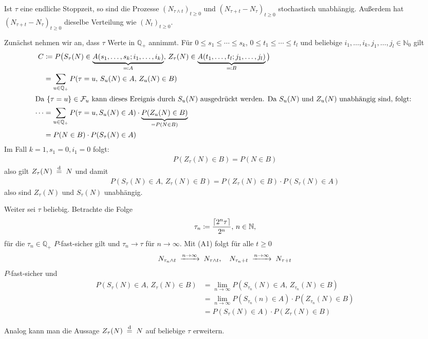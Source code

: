 \documentclass[a4paper,twoside,DIV15,BCOR12mm]{scrbook}
\newcommand{\cF}{\mathcal F}
\begin{document}
\begin{lemma}
\label{lem:7.2}
Ist $\tau$ eine endliche Stoppzeit, so sind die Prozesse $(N_{\tau \wedge t})_{t\ge 0}$ und $(N_{\tau + t}-N_\tau)_{t\ge 0}$ stochastisch unabhängig. Außerdem hat $(N_{\tau + t}-N_\tau)_{t\ge 0}$ dieselbe Verteilung wie $(N_t)_{t\ge 0}$.
\end{lemma}

\begin{beweis}
Zunächst nehmen wir an, dass $\tau$ Werte in $\mathbb Q_+$ annimmt. Für $0\le s_1\le\cdots\le s_k$, $0\le t_1\le \cdots\le t_l$ und beliebige $i_1,\ldots,i_k,j_1,\ldots,j_l\in \mathbb N_0$ gilt
\begin{align*}
C&\da P\big(S_\tau(N) \in \underbrace{A(s_1,\ldots,s_k;i_1,\ldots,i_k)}_{\ad A},\,
Z_\tau(N) \in \underbrace{A(t_1,\ldots,t_l;j_1,\ldots,j_l)}_{\ad B}
\big) \\
&= \sum_{u\in \mathbb Q_+} P(\tau = u,\, S_u(N)\in A,\, Z_u(N)\in B)\\
\intertext{Da $\{\tau = u \} \in \cF_u$ kann dieses Ereignis durch $S_u(N)$ ausgedrückt werden. Da $S_u(N)$ und $Z_u(N)$ unabhängig sind, folgt:
}
\cdots &= \sum_{u\in\mathbb Q_+} P(\tau = u, S_u(N)\in A) \cdot \underbrace{P(Z_u(N)\in B)}_{= P(N\in B)} \\
&= P(N\in B) \cdot P(S_\tau(N) \in A)
\end{align*}
Im Fall $k=1,s_1=0,i_1=0$ folgt:
\begin{align*}
P(Z_\tau(N)\in B) = P(N\in B)
\end{align*}
also gilt $Z_\tau(N) \gleichnach{d} N$ und damit
\begin{align*}
P(S_\tau (N) \in A,\, Z_\tau(N)\in B) = P(Z_\tau (N) \in B) \cdot P(S_\tau(N)\in A)
\end{align*}
also sind $Z_\tau(N)$ und $S_\tau(N)$ unabhängig.

Weiter sei $\tau$ beliebig. Betrachte die Folge 
\[
\tau_n \da \frac{\lceil 2^n \tau \rceil}{2^n},\, n\in \mathbb N,
\]
für die $\tau_n\in \mathbb Q_+$ $P$-fast-sicher gilt und $\tau_n\to \tau$ für $n\to\infty$. Mit (A1) folgt für alle $t\ge 0$
\[
N_{\tau_n\wedge t} \tomit{n\to\infty} N_{\tau \wedge t},\quad N_{\tau_n+t}\tomit{n\to\infty}N_{\tau+t}
\]
$P$-fast-sicher und
\begin{align*}
P(S_\tau(N)\in A,\, Z_\tau(N)\in B) 
&= \lim_{n\to\infty} P(S_{\tau_n}(N)\in A,\, Z_{\tau_n}(N)\in B) \\
&= \lim_{n\to\infty} P(S_{\tau_n}(n)\in A) \cdot P(Z_{\tau_n}(N)\in B)\\
&= P(S_\tau(N)\in A)\cdot P(Z_\tau(N)\in B)
\end{align*}

Analog kann man die Aussage $Z_\tau(N)\gleichnach{d}N$ auf beliebige $\tau$ erweitern.
\end{beweis}
\end{document}
